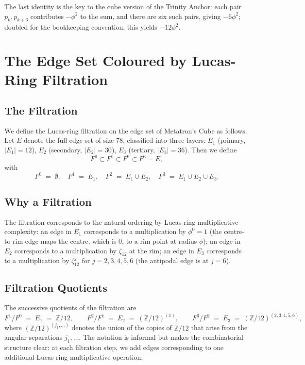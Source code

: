 The last identity is the key to the cube version of the Trinity
Anchor: each pair $p_{k}, p_{k+6}$ contributes $-\phi^{2}$ to the
sum, and there are six such pairs, giving $-6 \phi^{2}$; doubled
for the bookkeeping convention, this yields $-12 \phi^{2}$.

\section{The Edge Set Coloured by Lucas-Ring Filtration}
\label{sec:13-filtration}

\subsection{The Filtration}
\label{fa_13:sec:13-filt-def}

We define the Lucas-ring filtration on the edge set of Metatron's
Cube as follows. Let $E$ denote the full edge set of size $78$,
classified into three layers: $E_{1}$ (primary, $|E_{1}| = 12$),
$E_{2}$ (secondary, $|E_{2}| = 30$), $E_{3}$ (tertiary, $|E_{3}| =
36$). Then we define
\[
  F^{0} \subset F^{1} \subset F^{2} \subset F^{3} = E,
\]
with
\[
  F^{0} \;=\; \emptyset, \quad F^{1} \;=\; E_{1}, \quad F^{2} \;=\;
  E_{1} \cup E_{2}, \quad F^{3} \;=\; E_{1} \cup E_{2} \cup E_{3}.
\]

\subsection{Why a Filtration}
\label{fa_13:sec:13-filt-why}

The filtration corresponds to the natural ordering by Lucas-ring
multiplicative complexity: an edge in $E_{1}$ corresponds to a
multiplication by $\phi^{0} = 1$ (the centre-to-rim edge maps the
centre, which is $0$, to a rim point at radius $\phi$); an edge in
$E_{2}$ corresponds to a multiplication by $\zeta_{12}$ at the
rim; an edge in $E_{3}$ corresponds to a multiplication by
$\zeta_{12}^{j}$ for $j = 2, 3, 4, 5, 6$ (the antipodal edge is at
$j = 6$).

\subsection{Filtration Quotients}
\label{fa_13:sec:13-filt-quotients}

The successive quotients of the filtration are
\[
  F^{1} / F^{0} \;=\; E_{1} \;=\; \mathbb{Z}/12, \qquad
  F^{2} / F^{1} \;=\; E_{2} \;=\; (\mathbb{Z}/12)^{(1)}, \qquad
  F^{3} / F^{2} \;=\; E_{3} \;=\; (\mathbb{Z}/12)^{(2,3,4,5,6)},
\]
where $(\mathbb{Z}/12)^{(j_{1}, \ldots)}$ denotes the union of the
copies of $\mathbb{Z}/12$ that arise from the angular separations
$j_{1}, \ldots$. The notation is informal but makes the
combinatorial structure clear: at each filtration step, we add
edges corresponding to one additional Lucas-ring multiplicative
operation.

